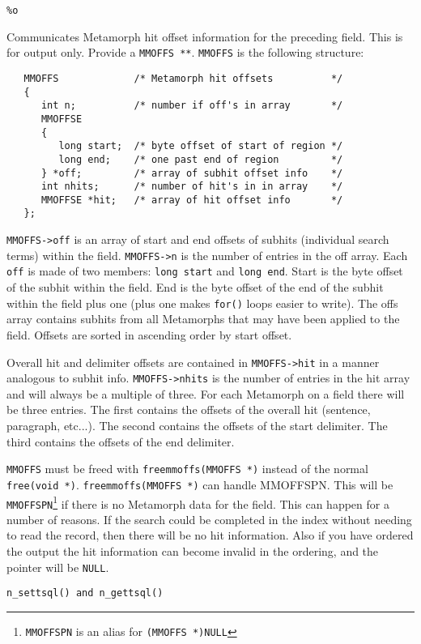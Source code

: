 \begin{verbatim}
%o
\end{verbatim}
Communicates Metamorph hit offset information for the preceding field.
This is for output only. Provide a \verb`MMOFFS **`.
\verb`MMOFFS` is the following structure:
\begin{verbatim}
   MMOFFS             /* Metamorph hit offsets          */
   {
      int n;          /* number if off's in array       */
      MMOFFSE
      {
         long start;  /* byte offset of start of region */
         long end;    /* one past end of region         */
      } *off;         /* array of subhit offset info    */
      int nhits;      /* number of hit's in in array    */
      MMOFFSE *hit;   /* array of hit offset info       */
   };
\end{verbatim}
\verb`MMOFFS->off` is an array of start and end offsets of
subhits (individual search terms)
within the field. \verb`MMOFFS->n` is the number of entries
in the off array. Each \verb`off` is made of two members: \verb`long start`
and \verb`long end`. Start is the byte offset of the subhit within
the field. End is the byte offset of the end of the subhit within
the field plus one (plus one makes \verb`for()` loops easier to write).
The offs array contains subhits from all Metamorphs that may have been
applied to the field. Offsets are sorted in ascending order by start offset.

Overall hit and delimiter offsets are contained in \verb`MMOFFS->hit` in
a manner analogous to subhit info.  \verb`MMOFFS->nhits` is the number
of entries in the hit array and will always be a multiple of three.  For
each Metamorph on a field there will be three entries.  The first
contains the offsets of the overall hit (sentence, paragraph, etc...).
The second contains the
offsets of the start delimiter.  The third contains the offsets of the
end delimiter.

\verb`MMOFFS` must be freed with \verb`freemmoffs(MMOFFS *)` instead of the
normal \verb`free(void *)`. \verb`freemmoffs(MMOFFS *)` can handle MMOFFSPN.
This will be \verb`MMOFFSPN`\footnote{\verb`MMOFFSPN` is an alias for
\verb`(MMOFFS *)NULL`} if there is no Metamorph data for the field.  This
can happen for a number of reasons.  If the search could be completed in
the index without needing to read the record, then there will be no hit
information.  Also if you have ordered the output the hit information
can become invalid in the ordering, and the pointer will be \verb|NULL|.

\SEE
\begin{verbatim}
n_settsql() and n_gettsql()
\end{verbatim}

